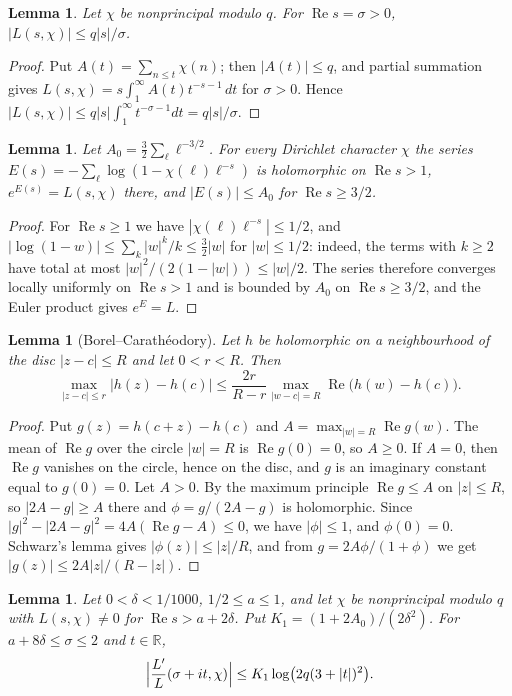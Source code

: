 \documentclass[screen,reqno]{aomart}
\numberwithin{equation}{section}
\newtheorem{lemma}[theorem]{Lemma}
\theoremstyle{definition}
\renewcommand{\Re}{\operatorname{Re}}
\newcommand{\R}{\mathbb{R}}
\begin{document}
\begin{lemma}\label{lem:size}
Let $\chi$ be nonprincipal modulo $q$. For $\Re s=\sigma>0$, $|L(s,\chi)|\le q|s|/\sigma$.
\end{lemma}

\begin{proof}
Put $A(t)=\sum_{n\le t}\chi(n)$; then $|A(t)|\le q$, and partial summation gives
$L(s,\chi)=s\int_1^\infty A(t)t^{-s-1}\,dt$ for $\sigma>0$. Hence
$|L(s,\chi)|\le q|s|\int_1^\infty t^{-\sigma-1}dt=q|s|/\sigma$.
\end{proof}

\begin{lemma}\label{lem:euler}
Let $A_0=\frac32\sum_\ell\ell^{-3/2}$. For every Dirichlet character $\chi$ the series
$E(s)=-\sum_\ell\log(1-\chi(\ell)\ell^{-s})$ is holomorphic on $\Re s>1$, $e^{E(s)}=L(s,\chi)$
there, and $|E(s)|\le A_0$ for $\Re s\ge3/2$.
\end{lemma}

\begin{proof}
For $\Re s\ge1$ we have $|\chi(\ell)\ell^{-s}|\le1/2$, and $|\log(1-w)|\le\sum_k|w|^k/k
\le\frac32|w|$ for $|w|\le1/2$: indeed, the terms with $k\ge2$ have total at most
$|w|^2/(2(1-|w|))\le |w|/2$. The series therefore converges locally uniformly on $\Re s>1$
and is bounded by $A_0$ on $\Re s\ge3/2$, and the Euler product gives $e^E=L$.
\end{proof}

\begin{lemma}[Borel--Carath\'eodory]\label{lem:bc}
Let $h$ be holomorphic on a neighbourhood of the disc $|z-c|\le R$ and let $0<r<R$. Then
\[
  \max_{|z-c|\le r}|h(z)-h(c)|\le\frac{2r}{R-r}\max_{|w-c|=R}\Re\bigl(h(w)-h(c)\bigr).
\]
\end{lemma}

\begin{proof}
Put $g(z)=h(c+z)-h(c)$ and $A=\max_{|w|=R}\Re g(w)$. The mean of $\Re g$ over the circle
$|w|=R$ is $\Re g(0)=0$, so $A\ge0$. If $A=0$, then $\Re g$ vanishes on the circle, hence on the
disc, and $g$ is an imaginary constant equal to $g(0)=0$. Let $A>0$. By the maximum principle
$\Re g\le A$ on $|z|\le R$, so $|2A-g|\ge A$ there and $\phi=g/(2A-g)$ is holomorphic. Since
$|g|^2-|2A-g|^2=4A(\Re g-A)\le0$, we have $|\phi|\le1$, and $\phi(0)=0$. Schwarz's lemma gives
$|\phi(z)|\le|z|/R$, and from $g=2A\phi/(1+\phi)$ we get $|g(z)|\le2A|z|/(R-|z|)$.
\end{proof}

\begin{lemma}\label{lem:logderiv}
Let $0<\delta<1/1000$, $1/2\le a\le1$, and let $\chi$ be nonprincipal modulo $q$ with
$L(s,\chi)\ne0$ for $\Re s>a+2\delta$. Put $K_1=(1+2A_0)/(2\delta^2)$. For
$a+8\delta\le\sigma\le2$ and $t\in\R$,
\[
  \Bigl|\frac{L'}{L}(\sigma+it,\chi)\Bigr|\le K_1\log\bigl(2q(3+|t|)^2\bigr).
\]
\end{lemma}
\end{document}
